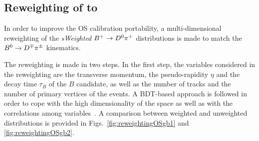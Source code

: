 \subsection[Reweighting of $\Bp\to\Dz\pip$ to $\Bz\to\Dmp\pipm$]{Reweighting of \boldmath{$\Bp\to\Dz\pip$} to \boldmath{$\Bz\to\Dmp\pipm$}}
\label{app:ReweightingOSTagging}

In order to improve the OS calibration portability, a multi-dimensional reweighting of the \emph{sWeighted} $\Bp\to\Dz\pip$ distributions
is made to match the $\Bz\to\Dmp\pipm$ kinematics.

The reweighting is made in two steps. In the first step, the variables considered in the reweighting are 
the transverse momentum, the pseudo-rapidity $\eta$ and the decay time $\tau_{B}$ of the $B$ candidate, as well as the
number of tracks and the number of primary vertices of the events. A BDT-based approach is followed in order to cope with 
the high dimensionality of the space as well as with the correlations among variables~\cite{hepml}. A comparison between 
weighted and unweighted distributions is provided in Figs.~\ref{fig:reweightingOSgb1} and \ref{fig:reweightingOSgb2}. 

